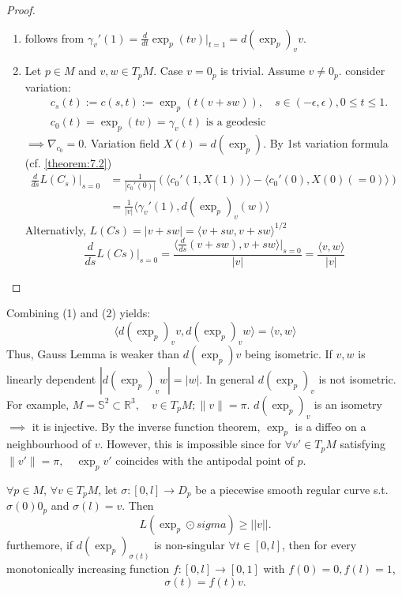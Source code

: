 \begin{proof}
\begin{enumerate}[label=(\arabic*)]
\item follows from $\gamma_v'(1) = \frac{d}{dt} \exp_p (tv) |_{t=1}= d(\exp_p)_v v$.

\item Let $ p \in M$ and $v,w \in T_pM$. Case $v=0_p$ is trivial.
Assume $ v \neq 0_p$. consider variation:
\[
\begin{aligned}
&c_s (t) := c(s,t) := \exp_p (t(v+sw)), \quad s \in (- \epsilon, \epsilon), 0 \leq t \leq 1. \\
&c_0(t) = \exp_p (tv) = \gamma_v (t) \text{ is a geodesic}
\end{aligned}
\]
$\implies \nabla_{c_0} = 0$. Variation field $X(t) = d(\exp_p)$.
By 1st variation formula (cf. \autoref{theorem:7.2})
\[
\begin{aligned}
\frac{d}{ds} L(C_s)|_{s=0} &= \frac{1}{|c_0'(0)|} \left( \langle c_0'(1, X(1)) \rangle - \langle c_0'(0), X(0) (=0) \rangle \right) \\
&= \frac{1}{|v|} \langle \gamma_v'(1), d(\exp_p)_v(w) \rangle
\end{aligned}
\]
Alternativly, $L(Cs) = |v+sw| = \langle v+sw, v +sw \rangle^{1/2}$
\[
\frac{d}{ds} L(Cs) |_{s=0} = \frac{\langle \frac{d}{ds}(v+sw), v +sw \rangle|_{s=0}}{|v|} = \frac{\langle v,w \rangle}{|v|}
\]
\end{enumerate}
\end{proof}

\begin{remark}
    Combining (1) and (2) yields:
    $$
    \langle d(\exp_p)_v v, d(\exp_p)_v w \rangle = \langle v,w \rangle
    $$
    Thus, Gauss Lemma is weaker than $d(\exp_p)v$ being isometric.
    If ${v,w}$ is linearly dependent $|d(\exp_p)_v w | = |w|$.
    In general $d(\exp_p)_v$ is not isometric.
    For example, $M = \mathbb{S}^2 \subset \mathbb{R}^3, \quad v \in T_pM; \|v\|=\pi$.
    $d(\exp_p)_v$ is an isometry $\implies$ it is injective.
    By the inverse function theorem, $\exp_p$ is a diffeo on a neighbourhood of $v$. However, this is impossible since for $\forall v' \in T_pM$ satisfying 
    $\|v'\| = \pi, \quad \exp_p v'$ coincides with the antipodal point of $p$.
    \label{remark:10.7}
\end{remark}

\begin{lemma}\label{lemma:10.8}
$\forall p \in M$, $\forall v \in T_pM$, let $\sigma : [0,l]\to D_p$ be a piecewise smooth regular curve s.t. $\sigma(0)  0_p$ and
$\sigma(l)= v$. Then
\[
L(\exp_p \odot sigma) \geq ||v||.
\]
furthemore, if $d(\exp_p)_{\sigma(t)}$ is non-singular $\forall t \in [0,l]$, then
for every monotonically increasing function $f:[0,l] \to [0,1]$ with $f(0) = 0, f(l) = 1$,
\[
\sigma(t) = f(t)v.
\]
\end{lemma}

